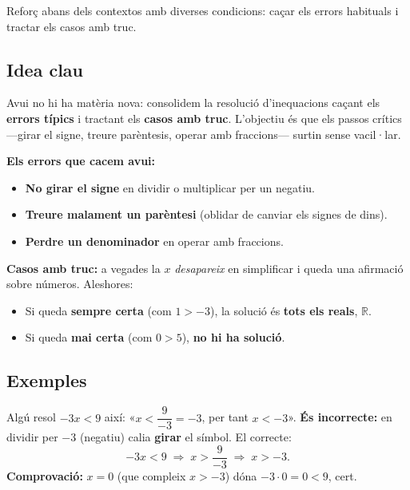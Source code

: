 %
{Reforç abans dels contextos amb diverses condicions: caçar els errors habituals i tractar els casos amb truc.}

\subsection{Idea clau}

Avui no hi ha matèria nova: consolidem la resolució d'inequacions caçant els
\textbf{errors típics} i tractant els \textbf{casos amb truc}. L'objectiu és que els
passos crítics —girar el signe, treure parèntesis, operar amb fraccions— surtin
sense vacil·lar.

\begin{idea}
\textbf{Els errors que cacem avui:}
\begin{itemize}[leftmargin=1.4em, itemsep=2pt]
  \item \textbf{No girar el signe} en dividir o multiplicar per un negatiu.
  \item \textbf{Treure malament un parèntesi} (oblidar de canviar els signes de dins).
  \item \textbf{Perdre un denominador} en operar amb fraccions.
\end{itemize}
\textbf{Casos amb truc:} a vegades la $x$ \emph{desapareix} en simplificar i queda
una afirmació sobre números. Aleshores:
\begin{itemize}[leftmargin=1.4em, itemsep=2pt]
  \item Si queda \textbf{sempre certa} (com $1>-3$), la solució és \textbf{tots els
        reals}, $\mathbb{R}$.
  \item Si queda \textbf{mai certa} (com $0>5$), \textbf{no hi ha solució}.
\end{itemize}
\end{idea}

\subsection{Exemples}

\begin{exemple}
Algú resol $-3x<9$ així: «$x<\dfrac{9}{-3}=-3$, per tant $x<-3$». \textbf{És
incorrecte:} en dividir per $-3$ (negatiu) calia \textbf{girar} el símbol. El correcte:
\[
-3x<9 \;\Rightarrow\; x>\frac{9}{-3} \;\Rightarrow\; x>-3.
\]
\textbf{Comprovació:} $x=0$ (que compleix $x>-3$) dóna $-3\cdot 0=0<9$, cert.
\end{exemple}

